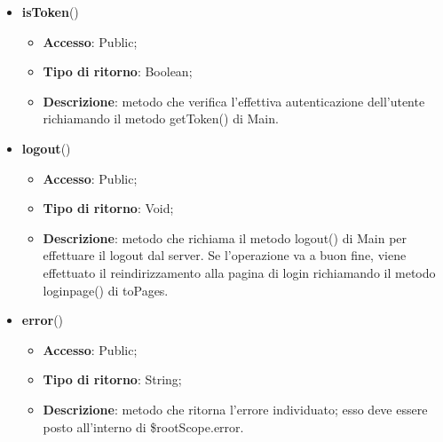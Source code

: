 {\begin{itemize}
\begin{itemize}
			\end{itemize}
			\item \textbf{isToken}()
			\begin{itemize}
				\item \textbf{Accesso}: Public;
				\item \textbf{Tipo di ritorno}: Boolean;
				\item \textbf{Descrizione}: metodo che verifica l'effettiva autenticazione dell'utente richiamando il metodo getToken() di Main.
			\end{itemize}
			\item \textbf{logout}()
			\begin{itemize}
				\item \textbf{Accesso}: Public;
				\item \textbf{Tipo di ritorno}: Void;
				\item \textbf{Descrizione}: metodo che richiama il metodo logout() di Main per effettuare il logout dal server. Se l'operazione va a buon fine, viene effettuato il reindirizzamento alla pagina di login richiamando il metodo loginpage() di toPages.
			\end{itemize}
			\item \textbf{error}()
			\begin{itemize}
				\item \textbf{Accesso}: Public;
				\item \textbf{Tipo di ritorno}: String;
				\item \textbf{Descrizione}: metodo che ritorna l'errore individuato; esso deve essere posto all'interno di \$rootScope.error.
			\end{itemize}
		\end{itemize}

}
